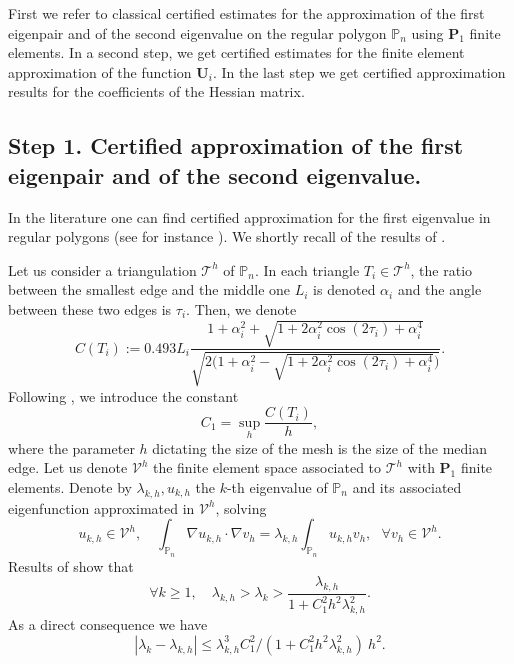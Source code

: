 \documentclass[11pt]{article}
\numberwithin{equation}{section}\newtheorem*{jepEnonce}{\jepEnonceTitle}\newenvironment{enonce*}[1]{\def\jepEnonceTitle{#1}\jepEnonce}{\endjepEnonce}\newtheorem*{conj*}{Conjecture}
\theoremstyle{plain}
\theoremstyle{definition}
\newcommand{\bo}[1]{{\boldsymbol#1}}
\def\Pp{{\mathbb{P}_n}}
\newcommand{\lb}{\lambda}
\begin{document}
First we refer to classical certified estimates for the approximation of the first eigenpair and of the second eigenvalue on the regular polygon $\Pp$ using $\bo P_1$ finite elements. In a second step, we get certified estimates for the finite element approximation of the function $\bo U_i$. In the last step we get certified approximation results for the coefficients of the Hessian matrix.

\subsection{Step 1. Certified approximation of the first eigenpair and of the second eigenvalue.}
\label{sec:eig-estimates}

In the literature one can find certified approximation for the first eigenvalue in regular polygons (see for instance \cite{Jo17}). We shortly recall of the results of \cite[Th.\,4.3]{LiOi13}.

Let us consider a triangulation ${\mathcal T}^h$ of $\Pp$. In each triangle $T_i\in {\mathcal T}^h$, the ratio between the smallest edge and the middle one $L_i$ is denoted $\alpha_i$ and the angle between these two edges is $\tau_i$. Then, we denote
\[
C(T_i):= 0.493 L_i\frac{1+ \alpha_i^2+\sqrt{1+2 \alpha_i^2 \cos(2\tau_i) + \alpha_i^4}}{\sqrt{2\Big (1+ \alpha_i^2-\sqrt{1+2 \alpha_i^2 \cos(2\tau_i) + \alpha_i^4}\Big)}}.
\]
Following \cite[\S 2]{LiOi13}, we introduce the constant
\begin{equation}\label{eq:C1}
C_1= \sup_h \frac{C(T_i)}{h},
\end{equation}
where the parameter $h$ dictating the size of the mesh is the size of the median edge.
Let us denote $\mathcal V^h$ the finite element space associated to ${\mathcal T}^h$ with $\bo P_1$ finite elements. Denote by $\lb_{k,h}, u_{k,h}$ the $k$-th eigenvalue of $\Pp$ and its associated eigenfunction approximated in $\mathcal V^h$, solving
\begin{equation}
u_{k,h} \in \mathcal V^h,\quad \int_\Pp \nabla u_{k,h}\cdot \nabla v_h = \lambda_{k,h}\int_\Pp u_{k,h} v_h, \ \ \ \forall v_h \in \mathcal V^h.
\label{eq:eigenvalue-finite-elements}
\end{equation}
Results of \cite{LiOi13} show that
\[
\forall k \ge 1, \quad \lb_{k,h} > \lb_k> \frac{\lb_{k,h}}{1+ C_1^2 h^2 \lb_{k,h}^2}.
\]
As a direct consequence we have
\begin{equation}
|\lambda_k-\lambda_{k,h}| \leq \lambda_{k,h}^3 C_1^2/(1+C_1^2h^2\lambda_{k,h}^2)\ h^2.
\label{eq:difflam}
\end{equation}
\end{document}
